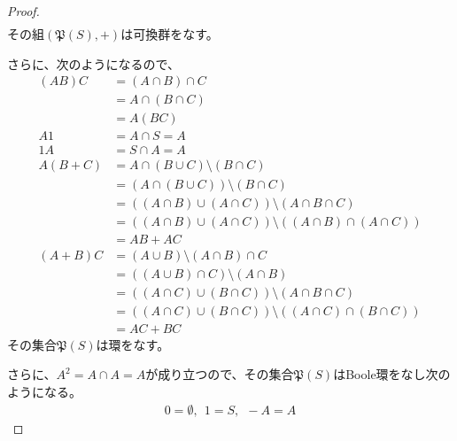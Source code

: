 \documentclass[dvipdfmx]{jsarticle}
\begin{document}
\begin{proof}
\begin{align*}
\end{align*}
その組$\left( \mathfrak{P}(S), + \right)$は可換群をなす。\par
さらに、次のようになるので、
\begin{align*}
(AB)C &= (A \cap B) \cap C\\
&= A \cap (B \cap C)\\
&= A(BC)\\
A1 &= A \cap S = A\\
1A &= S \cap A = A\\
A(B + C) &= A \cap (B \cup C) \setminus (B \cap C)\\
&= \left( A \cap (B \cup C) \right) \setminus (B \cap C)\\
&= \left( (A \cap B) \cup (A \cap C) \right) \setminus (A \cap B \cap C)\\
&= \left( (A \cap B) \cup (A \cap C) \right) \setminus \left( (A \cap B) \cap (A \cap C) \right)\\
&= AB + AC\\
(A + B)C &= (A \cup B) \setminus (A \cap B) \cap C\\
&= \left( (A \cup B) \cap C \right) \setminus (A \cap B)\\
&= \left( (A \cap C) \cup (B \cap C) \right) \setminus (A \cap B \cap C)\\
&= \left( (A \cap C) \cup (B \cap C) \right) \setminus \left( (A \cap C) \cap (B \cap C) \right)\\
&= AC + BC
\end{align*}
その集合$\mathfrak{P}(S)$は環をなす。\par
さらに、$A^{2} = A \cap A = A$が成り立つので、その集合$\mathfrak{P}(S)$はBoole環をなし次のようになる。
\begin{align*}
0 = \emptyset,\ \ 1 = S,\ \  - A = A
\end{align*}
\end{proof}
\end{document}
